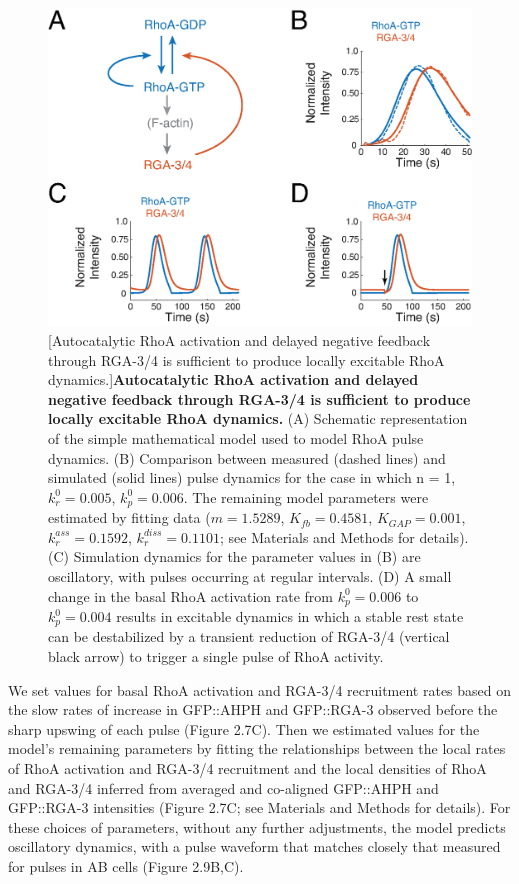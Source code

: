 \documentclass{ucetd}
\begin{document}
\begin{figure}[!htbp]
\centering
\includegraphics[width=1\textwidth]{Figure2-9}
[Autocatalytic RhoA activation and delayed negative feedback through RGA-3/4 is sufficient to produce locally excitable RhoA dynamics.]{\textbf{Autocatalytic RhoA activation and delayed negative feedback through RGA-3/4 is sufficient to produce locally excitable RhoA dynamics.} (A) Schematic representation of the simple mathematical model used to model RhoA pulse dynamics. (B) Comparison between measured (dashed lines) and simulated (solid lines) pulse dynamics for the case in which n = 1, $k_{r}^0 = 0.005$, $k_{p}^0 = 0.006$.  The remaining model parameters were estimated by fitting data ($m=1.5289$, $K_{fb}=0.4581$, $K_{GAP}=0.001$, $k_{r}^{ass}=0.1592$, $k_{r}^{diss}=0.1101$; see Materials and Methods for details).  (C) Simulation dynamics for the parameter values in (B) are oscillatory, with pulses occurring at regular intervals.  (D)  A small change in the basal RhoA activation rate from $k_{p}^0 = 0.006$ to $k_{p}^0 = 0.004$ results in excitable dynamics in which a stable rest state can be destabilized by a transient reduction of RGA-3/4 (vertical black arrow) to trigger a single pulse of RhoA activity.}
\end{figure}



We set values for basal RhoA activation and RGA-3/4 recruitment rates based on the slow rates of increase in GFP::AHPH and GFP::RGA-3 observed before the sharp upswing of each pulse (Figure 2.7C). Then we estimated values for the model's remaining parameters by fitting the relationships between the local rates of RhoA activation and RGA-3/4 recruitment and the local densities of RhoA and RGA-3/4 inferred from averaged and co-aligned GFP::AHPH and GFP::RGA-3 intensities  (Figure 2.7C; see Materials and Methods for details).   For these choices of parameters,  without any further adjustments, the model predicts oscillatory dynamics, with a pulse waveform that matches closely that measured for pulses in AB cells (Figure 2.9B,C).  
\end{document}
